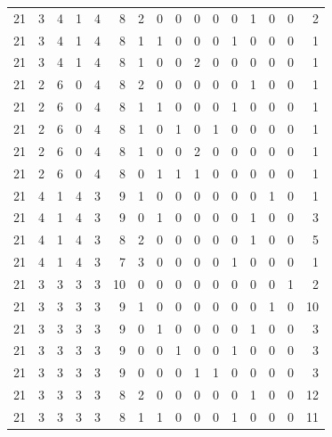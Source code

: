 \begin{appendix}
{\begin{longtable}{lrrrrrrrrrrrrrrr}
    21        & 3  & 4  & 1  & 4  & 8  & 2  & 0  & 0  & 0  & 0  & 0  & 1   & 0   & 0   & 2    \\
    21        & 3  & 4  & 1  & 4  & 8  & 1  & 1  & 0  & 0  & 0  & 1  & 0   & 0   & 0   & 1    \\
    21        & 3  & 4  & 1  & 4  & 8  & 1  & 0  & 0  & 2  & 0  & 0  & 0   & 0   & 0   & 1    \\
    21        & 2  & 6  & 0  & 4  & 8  & 2  & 0  & 0  & 0  & 0  & 0  & 1   & 0   & 0   & 1    \\
    21        & 2  & 6  & 0  & 4  & 8  & 1  & 1  & 0  & 0  & 0  & 1  & 0   & 0   & 0   & 1    \\
    21        & 2  & 6  & 0  & 4  & 8  & 1  & 0  & 1  & 0  & 1  & 0  & 0   & 0   & 0   & 1    \\
    21        & 2  & 6  & 0  & 4  & 8  & 1  & 0  & 0  & 2  & 0  & 0  & 0   & 0   & 0   & 1    \\
    21        & 2  & 6  & 0  & 4  & 8  & 0  & 1  & 1  & 1  & 0  & 0  & 0   & 0   & 0   & 1    \\
    21        & 4  & 1  & 4  & 3  & 9  & 1  & 0  & 0  & 0  & 0  & 0  & 0   & 1   & 0   & 1    \\
    21        & 4  & 1  & 4  & 3  & 9  & 0  & 1  & 0  & 0  & 0  & 0  & 1   & 0   & 0   & 3    \\
    21        & 4  & 1  & 4  & 3  & 8  & 2  & 0  & 0  & 0  & 0  & 0  & 1   & 0   & 0   & 5    \\
    21        & 4  & 1  & 4  & 3  & 7  & 3  & 0  & 0  & 0  & 0  & 1  & 0   & 0   & 0   & 1    \\
    21        & 3  & 3  & 3  & 3  & 10 & 0  & 0  & 0  & 0  & 0  & 0  & 0   & 0   & 1   & 2    \\
    21        & 3  & 3  & 3  & 3  & 9  & 1  & 0  & 0  & 0  & 0  & 0  & 0   & 1   & 0   & 10   \\
    21        & 3  & 3  & 3  & 3  & 9  & 0  & 1  & 0  & 0  & 0  & 0  & 1   & 0   & 0   & 3    \\
    21        & 3  & 3  & 3  & 3  & 9  & 0  & 0  & 1  & 0  & 0  & 1  & 0   & 0   & 0   & 3    \\
    21        & 3  & 3  & 3  & 3  & 9  & 0  & 0  & 0  & 1  & 1  & 0  & 0   & 0   & 0   & 3    \\
    21        & 3  & 3  & 3  & 3  & 8  & 2  & 0  & 0  & 0  & 0  & 0  & 1   & 0   & 0   & 12   \\
    21        & 3  & 3  & 3  & 3  & 8  & 1  & 1  & 0  & 0  & 0  & 1  & 0   & 0   & 0   & 11   \\

\end{longtable}}
\end{appendix}
